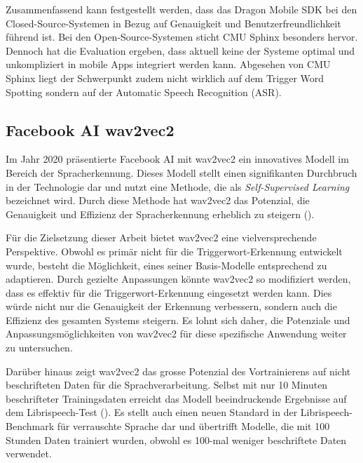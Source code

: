 \documentclass[11pt,a4paper]{article}
\begin{document}
\noindent \newline
Zusammenfassend kann festgestellt werden, dass das Dragon Mobile SDK bei den Closed-Source-Systemen 
in Bezug auf Genauigkeit und Benutzerfreundlichkeit führend ist. Bei den Open-Source-Systemen 
sticht CMU Sphinx besonders hervor. Dennoch hat die Evaluation ergeben, dass aktuell keine der 
Systeme optimal und unkompliziert in mobile Apps integriert werden kann. Abgesehen von CMU Sphinx 
liegt der Schwerpunkt zudem nicht wirklich auf dem Trigger Word Spotting sondern auf der
Automatic Speech Recognition (ASR).

\subsection{Facebook AI wav2vec2}

Im Jahr 2020 präsentierte Facebook AI mit wav2vec2 ein innovatives Modell im Bereich der 
Spracherkennung. Dieses Modell stellt einen signifikanten Durchbruch in der Technologie dar und 
nutzt eine Methode, die als \textit{Self-Supervised Learning} bezeichnet wird. Durch diese Methode 
hat wav2vec2 das Potenzial, die Genauigkeit und Effizienz der Spracherkennung erheblich zu steigern 
(\cite{baevski2020wav2vec}).

\noindent \newline
Für die Zielsetzung dieser Arbeit bietet wav2vec2 eine vielversprechende Perspektive. Obwohl es 
primär nicht für die Triggerwort-Erkennung entwickelt wurde, besteht die Möglichkeit, eines seiner 
Basis-Modelle entsprechend zu adaptieren. Durch gezielte Anpassungen könnte wav2vec2 so modifiziert 
werden, dass es effektiv für die Triggerwort-Erkennung eingesetzt werden kann. Dies würde nicht nur 
die Genauigkeit der Erkennung verbessern, sondern auch die Effizienz des gesamten Systems steigern. 
Es lohnt sich daher, die Potenziale und Anpassungsmöglichkeiten von wav2vec2 für diese spezifische 
Anwendung weiter zu untersuchen.

\noindent \newline
Darüber hinaus zeigt wav2vec2 das grosse Potenzial des Vortrainierens auf nicht beschrifteten 
Daten für die Sprachverarbeitung. Selbst mit nur 10 Minuten beschrifteter Trainingsdaten erreicht 
das Modell beeindruckende Ergebnisse auf dem Librispeech-Test (\cite{baevski2020wav2vec}). Es stellt 
auch einen neuen Standard in der Librispeech-Benchmark für verrauschte Sprache dar und übertrifft 
Modelle, die mit 100 Stunden Daten trainiert wurden, obwohl es 100-mal weniger beschriftete Daten 
verwendet.
\end{document}
